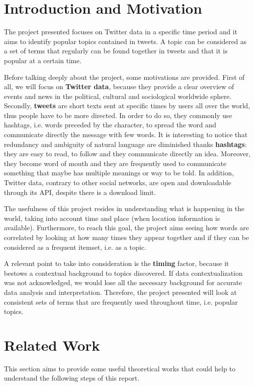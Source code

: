 \section{Introduction and Motivation}

The project presented focuses on Twitter data in a specific time period and it aims to identify popular topics contained in tweets. A topic can be considered as a set of terms that regularly can be found together in tweets and that it is popular at a certain time. 

Before talking deeply about the project, some motivations are provided. First of all, we will focus on \textbf{Twitter data}, because they provide a clear overview of events and news in the political, cultural and sociological worldwide sphere. Secondly, \textbf{tweets} are short texts sent at specific times by users all over the world, thus people have to be more directed. In order to do so, they commonly use hashtags, i.e. words preceded by the \inlinecode{\#} character, to spread the word and communicate directly the message with few words. It is interesting to notice that redundancy and ambiguity of natural language are diminished thanks \textbf{hashtags}: they are easy to read, to follow and they communicate directly an idea. Moreover, they become word of mouth and they are frequently used to communicate something that maybe has multiple meanings or way to be told. In addition, Twitter data, contrary to other social networks, are open and downloadable through its API, despite there is a download limit.

The usefulness of this project resides in understanding what is happening in the world, taking into account time and place (when location information is available). Furthermore, to reach this goal, the project aims seeing how words are correlated by looking at how many times they appear together and if they can be considered as a frequent itemset, i.e. as a topic. 

A relevant point to take into consideration is the \textbf{timing} factor, because it bestows a contextual background to topics discovered. If data contextualization was not acknowledged, we would lose all the necessary background for accurate data analysis and interpretation. Therefore, the project presented will look at consistent sets of terms that are frequently used throughout time, i.e. popular topics.

\section{Related Work}
This section aims to provide some useful theoretical works that could help to understand the following steps of this report. 

